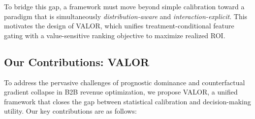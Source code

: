 \documentclass[runningheads]{llncs}
\begin{document}
To bridge this gap, a framework must move beyond simple calibration toward a paradigm that is simultaneously \textit{distribution-aware} and \textit{interaction-explicit}. This motivates the design of VALOR, which unifies treatment-conditional feature gating with a value-sensitive ranking objective to maximize realized ROI.



\subsection{Our Contributions: VALOR}
To address the pervasive challenges of prognostic dominance and counterfactual gradient collapse in B2B revenue optimization, we propose VALOR, a unified framework that closes the gap between statistical calibration and decision-making utility. Our key contributions are as follows:
\end{document}
